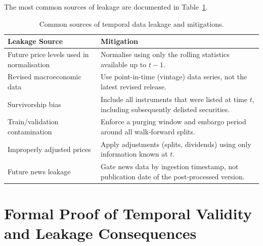 \documentclass[12pt,openany]{book}
\numberwithin{equation}{chapter}
\theoremstyle{plain}
\theoremstyle{definition}
\theoremstyle{remark}
\begin{document}
The most common sources of leakage are documented in Table~\ref{tab:leakage_sources}.

\begin{table}[H]
\centering
\caption{Common sources of temporal data leakage and mitigations.}
\label{tab:leakage_sources}
\small
\begin{tabularx}{\textwidth}{p{4.5cm} p{9.5cm}}
\toprule
\textbf{Leakage Source} & \textbf{Mitigation} \\
\midrule
Future price levels used in normalisation &
    Normalise using only the rolling statistics available up to $t-1$. \\
\midrule
Revised macroeconomic data &
    Use point-in-time (vintage) data series, not the latest revised release. \\
\midrule
Survivorship bias &
    Include all instruments that were listed at time $t$, including
    subsequently delisted securities. \\
\midrule
Train/validation contamination &
    Enforce a purging window and embargo period around all walk-forward splits. \\
\midrule
Improperly adjusted prices &
    Apply adjustments (splits, dividends) using only information known at $t$. \\
\midrule
Future news leakage &
    Gate news data by ingestion timestamp, not publication date of the
    post-processed version. \\
\bottomrule
\end{tabularx}
\end{table}

\section{Formal Proof of Temporal Validity and Leakage Consequences}
\end{document}
